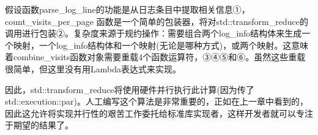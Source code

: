 假设函数parse\_log\_line的功能是从日志条目中提取相关信息①，count\_visits\_per\_page 函数是一个简单的包装器，将对std::transform\_reduce的调用进行包装②。复杂度来源于规约操作：需要组合两个log\_info结构体来生成一个映射，一个log\_info结构体和一个映射(无论是哪种方式)，或两个映射。这意味着combine\_visits函数对象需要重载4个函数运算符，③④⑤和⑥。虽然这些重载很简单，但这里没有用Lambda表达式来实现。

因此，std::transform\_reduce将使用硬件并行执行此计算(因为传了std::execution::par)。人工编写这个算法是非常重要的，正如在上一章中看到的，因此这允许将实现并行性的艰苦工作委托给标准库实现者，这样开发者就可以专注于期望的结果了。